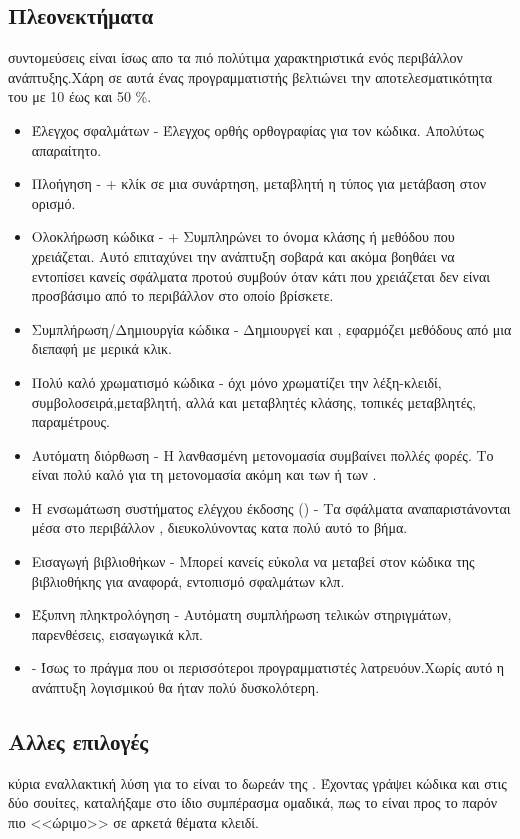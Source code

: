 \subsection*{Πλεονεκτήματα}
 συντομεύσεις είναι ίσως απο τα πιό πολύτιμα χαρακτηριστικά ενός περιβάλλον ανάπτυξης.Χάρη σε αυτά ένας προγραμματιστής βελτιώνει την αποτελεσματικότητα του με 10 έως και 50 \%.
\begin{itemize}
    \item Έλεγχος σφαλμάτων - Έλεγχος ορθής ορθογραφίας για τον κώδικα. Απολύτως απαραίτητο.
    \item Πλοήγηση - \keys{\e{\ctrl}} + κλίκ σε μια συνάρτηση, μεταβλητή η τύπος για μετάβαση στον ορισμό.
    \item Ολοκλήρωση κώδικα - \keys{\e{\ctrl}} + \keys{\e{\space}} Συμπληρώνει το όνομα κλάσης ή μεθόδου που χρειάζεται. Αυτό επιταχύνει την ανάπτυξη σοβαρά και ακόμα βοηθάει να εντοπίσει κανείς σφάλματα προτού συμβούν όταν κάτι που χρειάζεται δεν είναι προσβάσιμο από το περιβάλλον στο οποίο βρίσκετε.
    \item Συμπλήρωση/Δημιουργία κώδικα - Δημιουργεί  και , εφαρμόζει μεθόδους από μια διεπαφή με μερικά κλικ.
    \item Πολύ καλό χρωματισμό κώδικα -  όχι μόνο χρωματίζει την λέξη-κλειδί, συμβολοσειρά,μεταβλητή, αλλά και μεταβλητές κλάσης, τοπικές μεταβλητές, παραμέτρους.
    \item Αυτόματη διόρθωση - Η λανθασμένη μετονομασία συμβαίνει πολλές φορές. Το  είναι πολύ καλό για τη μετονομασία ακόμη και των  ή των .
    \item Η ενσωμάτωση συστήματος ελέγχου έκδοσης () - Τα  σφάλματα αναπαριστάνονται μέσα στο περιβάλλον , διευκολύνοντας κατα πολύ αυτό το βήμα.
    \item Εισαγωγή βιβλιοθήκων - Μπορεί κανείς εύκολα να μεταβεί στον κώδικα της βιβλιοθήκης για αναφορά, εντοπισμό σφαλμάτων κλπ.
   \item Έξυπνη πληκτρολόγηση - Αυτόματη συμπλήρωση τελικών στηριγμάτων, παρενθέσεις, εισαγωγικά κλπ.
   \item {} - Ίσως το πράγμα που οι περισσότεροι προγραμματιστές λατρευόυν.Χωρίς αυτό η ανάπτυξη λογισμικού θα ήταν πολύ δυσκολότερη.
\end{itemize}

\subsection*{Αλλες επιλογές}
 κύρια εναλλακτική λύση για το  είναι το δωρεάν  της .\newline
Έχοντας γράψει κώδικα και στις δύο σουίτες, καταλήξαμε στο ίδιο συμπέρασμα ομαδικά, πως το  είναι προς το παρόν πιο <<ώριμο>> σε αρκετά θέματα κλειδί.